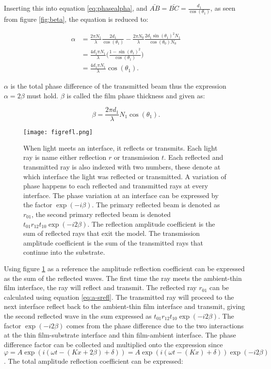 \documentclass[MasterThesisMain.tex]{subfiles}
\begin{document}
Inserting this into equation \ref{eq:phasealpha}, and $\bar{AB}=\bar{BC}=\frac{d_1}{\cos(\theta_1)}$, as seen from figure \ref{fig:beta}, the equation is reduced to:

\begin{align}
\alpha &= \frac{2\pi N_1}{\lambda}\frac{2d_1}{\cos(\theta_1)}-\frac{2\pi N_0}{\lambda}\frac{2d_1 \sin(\theta_1)^2N_1}{\cos(\theta_0)N_0}\\
&= \frac{4d_1\pi N_1}{\lambda}\bigg(\frac{1-\sin(\theta_1)^2}{\cos(\theta_1)}\bigg)\\
&= \frac{4d_1\pi N_1}{\lambda}\cos(\theta_1).
\end{align}

$\alpha$ is the total phase difference of the transmitted beam thus the expression $\alpha=2\beta$ must hold. $\beta$ is called the film phase thickness and given as: 

\begin{equation}
\beta=\frac{2\pi d_1}{\lambda} N_1\cos(\theta_1).
\end{equation}  

\begin{figure}
\centering
\texttt{[image: figrefl.png]}
\caption{When light meets an interface, it reflects or transmits. Each light ray is name either reflection $r$ or transmission $t$. Each reflected and transmitted ray is also indexed with two numbers, these denote at which interface the light was reflected or transmitted. A variation of phase happens to each reflected and transmitted rays at every interface. The phase variation at an interface can be expressed by the factor $\exp(-i\beta)$. The primary reflected beam is denoted as $r_{01}$, the second primary reflected beam is denoted $t_{01}r_{12}t_{10}\exp(-i2\beta)$. The reflection amplitude coefficient is the sum of reflected rays that exit the model. The transmission amplitude coefficient is the sum of the transmitted rays that continue into the substrate.}
\label{fig:reflect}
\end{figure}

Using figure \ref{fig:reflect} as a reference the amplitude reflection coefficient can be expressed as the sum of the reflected waves. The first time the ray meets the ambient-thin film interface, the ray will reflect and transmit. The reflected ray $r_{01}$ can be calculated using equation \ref{eq:a-srefl}. The transmitted ray will proceed to the next interface reflect back to the ambient-thin film interface and transmit, giving the second reflected wave in the sum expressed as $t_{01}r_{12}t_{10}\exp(-i2\beta)$. The factor $\exp(-i2\beta)$ comes from the phase difference due to the two interactions at the thin film-substrate interface and thin film-ambient interface. The phase difference factor can be collected and multiplied onto the expression since  $\varphi = A\exp(i(\omega t-(Kx+2\beta)+\delta))=A\exp(i(\omega t-(Kx)+\delta))\exp(-i2\beta)$. The total amplitude reflection coefficient can be expressed:
\end{document}
